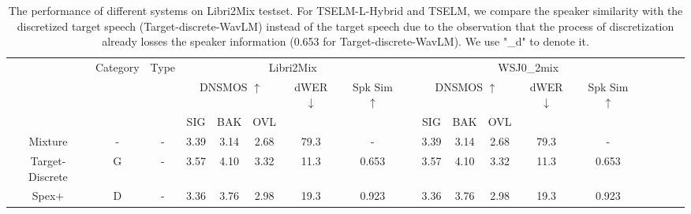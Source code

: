 \documentclass[conference]{IEEEtran}
\begin{document}
\begin{table}
  \caption{The performance of different systems on Libri2Mix testset. For TSELM-L-Hybrid  
  and TSELM, we compare the speaker similarity with the discretized target speech 
  (Target-discrete-WavLM) instead of the target speech due to the observation that 
  the process of discretization already losses the speaker information (0.653 for 
  Target-discrete-WavLM). We use "\_d" to denote it. }
  \renewcommand{\arraystretch}{1.2}
  \begin{center}
  \begin{tabular}{cccccccccccccccccc}
    \Xhline{2\arrayrulewidth} %
  \multirow{3}{*}{System} & \multicolumn{1}{l}{\multirow{3}{*}{Category}} & \multicolumn{1}{l}{\multirow{3}{*}{Type}} &  \multicolumn{5}{c}{Libri2Mix}                    &                               & \multicolumn{5}{c}{WSJ0\_2mix}                                                  \\
  \cline{4-8} \cline{10-14}
                          & \multicolumn{1}{l}{}                                                 & \multicolumn{1}{l}{}                            & \multicolumn{3}{c}{DNSMOS $\uparrow$} & dWER $\downarrow$ & Spk Sim $\uparrow$ &  & \multicolumn{3}{c}{DNSMOS $\uparrow$} & dWER $\downarrow$ & Spk Sim $\uparrow$  \\ \cline{4-6} \cline{10-12}
                          & \multicolumn{1}{l}{}                                                    & \multicolumn{1}{l}{}                            & SIG         & BAK        & OVL        &                   &        &             & SIG         & BAK        & OVL        &                   &                    \\ \hline
  Mixture                 & -                                             & -                                                                                           & 3.39        & 3.14       & 2.68       & 79.3            & -        &           & 3.39        & 3.14       & 2.68       & 79.3            & -                  \\
  Target-Discrete         & G                                             & -                                                                                          & 3.57        & 4.10       & 3.32       & 11.3            & 0.653     &          & 3.57        & 4.10       & 3.32       & 11.3            & 0.653               \\ \hline
  Spex+                   & D                                             & -                                                                                  & 3.36        & 3.76       & 2.98       & 19.3            & 0.923     &          & 3.36        & 3.76       & 2.98       & 19.3            & 0.923             \\ \hline

\end{tabular}
\end{center}
\end{table}
\end{document}

